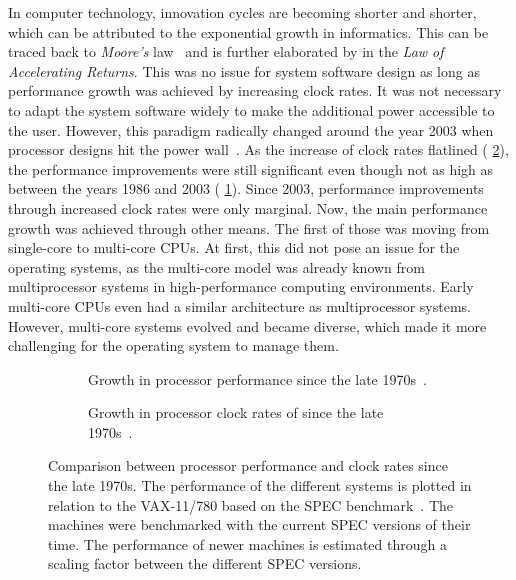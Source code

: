 In computer technology, innovation cycles are becoming shorter and shorter, which can be attributed to the exponential growth in informatics. This can be traced back to \emph{Moore's} law~\cite{Moore-1965-Law} and is further elaborated by \textcite{Kurzweil-2004-AcceleratingReturns} in the \emph{Law of Accelerating Returns}. This was no issue for system software design as long as performance growth was achieved by increasing clock rates. It was not necessary to adapt the system software widely to make the additional power accessible to the user. However, this paradigm radically changed around the year 2003 when processor designs hit the power wall~\cite{Patterson-2011-ComputerArchitecture}. As the increase of clock rates flatlined (\cf{} \cref{fig:intro:arch2}), the performance improvements were still significant even though not as high as between the years 1986 and 2003 (\cf{} \cref{fig:intro:arch1}). Since 2003, performance improvements through increased clock rates were only marginal. Now, the main performance growth was achieved through other means. The first of those was moving from single-core to multi-core CPUs. At first, this did not pose an issue for the operating systems, as the multi-core model was already known from multiprocessor systems in high-performance computing environments. Early multi-core CPUs even had a similar architecture as multiprocessor systems.  However, multi-core systems evolved and became diverse, which made it more challenging for the operating system to manage them.


\begin{figure}\centering
	\begin{subfigure}[b]{\textwidth}\centering
		\caption[Growth in processor performance since the late 1970s.]{Growth in processor performance since the late 1970s~\cite[3]{Patterson-2011-ComputerArchitecture}.}%
		\label{fig:intro:arch1}
	\end{subfigure}\vspace{0.5cm}
	\begin{subfigure}[b]{\textwidth}\centering
		\caption[Growth in clock rate of processors since the late 1970s.]{Growth in processor clock rates of since the late 1970s~\cite[24]{Patterson-2011-ComputerArchitecture}.}%
		\label{fig:intro:arch2}
	\end{subfigure}
	\caption[Comparison between processor performance and clock rates.]{Comparison between processor performance and clock rates since the late 1970s. The performance of the different systems is plotted in relation to the VAX-11/780 based on the SPEC benchmark~\cite{SPEC}. The machines were benchmarked with the current SPEC versions of their time. The performance of newer machines is estimated through a scaling factor between the different SPEC versions.}%
	\label{fig:intro:arch}
\end{figure}

